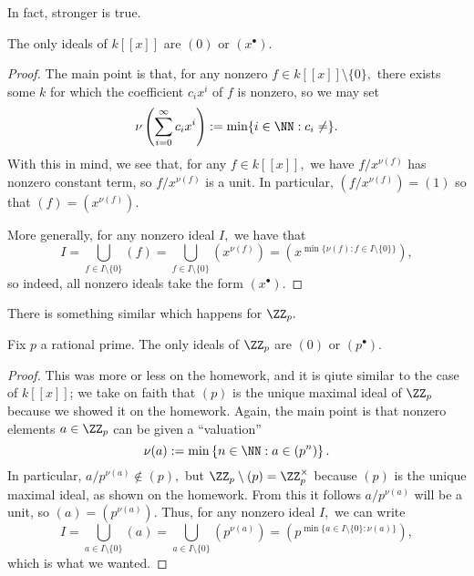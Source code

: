 In fact, stronger is true.
\begin{proposition}
	The only ideals of $k[[x]]$ are $(0)$ or $\left(x^\bullet\right).$
\end{proposition}
\begin{proof}
	The main point is that, for any nonzero $f\in k[[x]]\setminus\{0\},$ there exists some $k$ for which the coefficient $c_ix^i$ of $f$ is nonzero, so we may set
	\[\nu\left(\sum_{i=0}^\infty c_ix^i\right):=\min\{i\in\NN:c_i\ne\}.\]
	With this in mind, we see that, for any $f\in k[[x]],$ we have $f/x^{\nu(f)}$ has nonzero constant term, so $f/x^{\nu(f)}$ is a unit. In particular, $\left(f/x^{\nu(f)}\right)=(1)$ so that $(f)=\left(x^{\nu(f)}\right).$

	More generally, for any nonzero ideal $I,$ we have that
	\[I=\bigcup_{f\in I\setminus\{0\}}(f)=\bigcup_{f\in I\setminus\{0\}}\left(x^{\nu(f)}\right)=\left(x^{\min\{\nu(f):f\in I\setminus\{0\}\}}\right),\]
	so indeed, all nonzero ideals take the form $\left(x^\bullet\right).$
\end{proof}
There is something similar which happens for $\ZZ_p.$
\begin{proposition}
	Fix $p$ a rational prime. The only ideals of $\ZZ_p$ are $(0)$ or $\left(p^\bullet\right).$
\end{proposition}
\begin{proof}
	This was more or less on the homework, and it is qiute similar to the case of $k[[x]]$; we take on faith that $(p)$ is the unique maximal ideal of $\ZZ_p$ because we showed it on the homework. Again, the main point is that nonzero elements $a\in\ZZ_p$ can be given a ``valuation''
	\[\nu(a):=\min\left\{n\in\NN:a\in\left(p^n\right)\right\}.\]
	In particular, $a/p^{\nu(a)}\notin(p),$ but $\ZZ_p\setminus(p)=\ZZ_p^\times$ because $(p)$ is the unique maximal ideal, as shown on the homework. From this it follows $a/p^{\nu(a)}$ will be a unit, so $(a)=\left(p^{\nu(a)}\right).$ Thus, for any nonzero ideal $I,$ we can write
	\[I=\bigcup_{a\in I\setminus\{0\}}(a)=\bigcup_{a\in I\setminus\{0\}}\left(p^{\nu(a)}\right)=\left(p^{\min\{a\in I\setminus\{0\}:\nu(a)\}}\right),\]
	which is what we wanted.
\end{proof}

